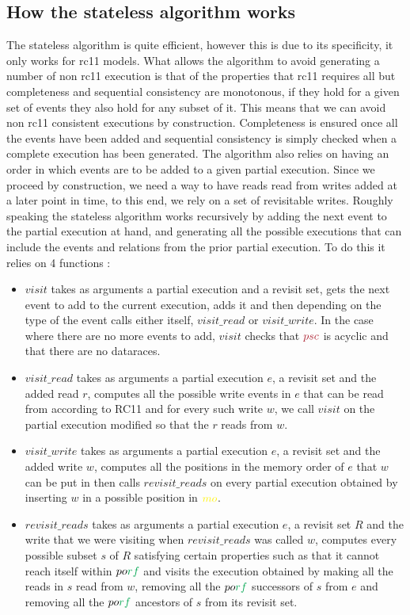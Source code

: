 \documentclass[a4,12pt]{article}
\newcommand{\mo}{{\color{Yellow}mo}}
\newcommand{\psc}{{\color{Maroon}psc}}
\newcommand{\po}{po}
\newcommand{\rf}{{\color{Green}rf}}
\begin{document}
\subsection{How the stateless algorithm works}

The stateless algorithm is quite efficient, however this is due to its specificity, it only works for rc11 models. What allows the algorithm to avoid generating a number of non rc11 execution is that of the properties that rc11 requires all but completeness and sequential consistency are monotonous, if they hold for a given set of events they also hold for any subset of it. This means that we can avoid non rc11 consistent executions by construction. Completeness is ensured once all the events have been added and sequential consistency is simply checked when a complete execution has been generated. The algorithm also relies on having an order in which events are to be added to a given partial execution. Since we proceed by construction, we need a way to have reads read from writes added at a later point in time, to this end, we rely on a set of revisitable writes.
Roughly speaking the stateless algorithm works recursively by adding the next event to the partial execution at hand, and generating all the possible executions that can include the events and relations from the prior partial execution. To do this it relies on 4 functions :

\begin{itemize}
\item $visit$ takes as arguments a partial execution and a revisit set, gets the next event to add to the current execution, adds it and then depending on the type of the event calls either itself, $visit\_read$ or $visit\_write$. In the case where there are no more events to add, $visit$ checks that $\psc$ is acyclic and that there are no dataraces.
\item $visit\_read$ takes as arguments a partial execution $e$, a revisit set and the added read $r$, computes all the possible write events in $e$ that can be read from according to RC11 and for every such write $w$, we call $visit$ on the partial execution modified so that the $r$ reads from $w$.
\item $visit\_write$ takes as arguments a partial execution $e$, a revisit set and the added write $w$, computes all the positions in the memory order of $e$ that $w$ can be put in then calls $revisit\_reads$ on every partial execution obtained by inserting $w$ in a possible position in $\mo$.
\item $revisit\_reads$ takes as arguments a partial execution $e$, a revisit set $R$ and the write that we were visiting when $revisit\_reads$ was called $w$, computes every possible subset $s$ of $R$ satisfying certain properties such as that it cannot reach itself within $\po\rf$ and visits the execution obtained by making all the reads in $s$ read from $w$, removing all the $\po \rf$ successors of $s$ from $e$ and removing all the $\po\rf$ ancestors of $s$ from its revisit set.
\end{itemize}
\end{document}
